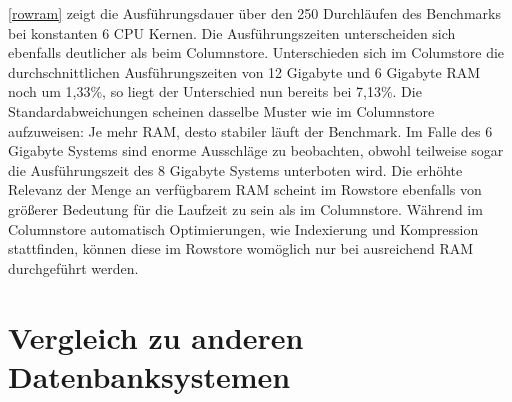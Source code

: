\autoref{rowram} zeigt die Ausführungsdauer über den 250 Durchläufen des Benchmarks bei konstanten 6 CPU Kernen. Die Ausführungszeiten unterscheiden sich ebenfalls deutlicher als beim Columnstore. Unterschieden sich im Columstore die durchschnittlichen Ausführungszeiten von 12 Gigabyte und 6 Gigabyte RAM noch um 1,33\%, so liegt der Unterschied nun bereits bei 7,13\%. Die Standardabweichungen scheinen dasselbe Muster wie im Columnstore aufzuweisen: Je mehr RAM, desto stabiler läuft der Benchmark. Im Falle des 6 Gigabyte Systems sind enorme Ausschläge zu beobachten, obwohl teilweise sogar die Ausführungszeit des 8 Gigabyte Systems unterboten wird. 
Die erhöhte Relevanz der Menge an verfügbarem RAM scheint im Rowstore ebenfalls von größerer Bedeutung für die Laufzeit zu sein als im Columnstore. Während im Columnstore automatisch Optimierungen, wie Indexierung und Kompression stattfinden, können diese im Rowstore womöglich nur bei ausreichend RAM durchgeführt werden. 

\section{Vergleich zu anderen Datenbanksystemen}\label{auswertung:vergleich}


